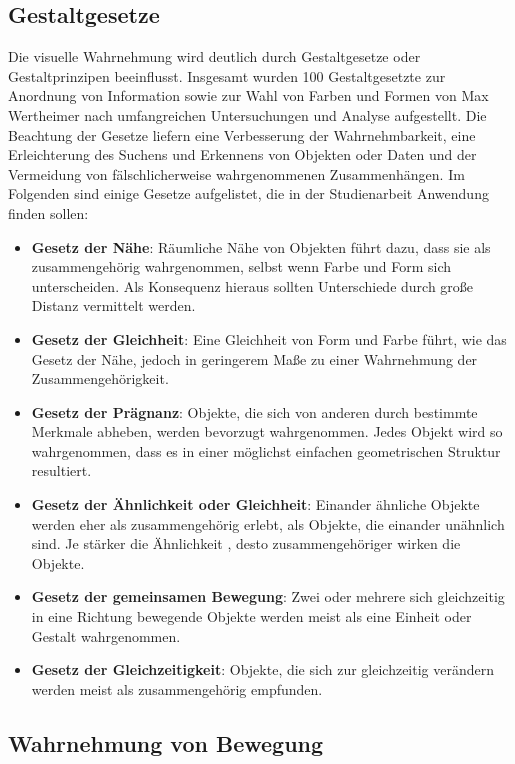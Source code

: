 \subsection{Gestaltgesetze}
Die visuelle Wahrnehmung wird deutlich durch Gestaltgesetze oder Gestaltprinzipen beeinflusst. Insgesamt wurden 100 Gestaltgesetzte zur Anordnung von Information sowie zur Wahl von Farben und Formen von Max Wertheimer nach umfangreichen Untersuchungen und Analyse aufgestellt. Die Beachtung der Gesetze liefern eine Verbesserung der Wahrnehmbarkeit, eine Erleichterung des Suchens und Erkennens von Objekten oder Daten und der Vermeidung von fälschlicherweise wahrgenommenen Zusammenhängen. \cite[S. 55 f.]{2010.Preim} Im Folgenden sind einige Gesetze aufgelistet, die in der Studienarbeit Anwendung finden sollen:

\begin{itemize}
\item \textbf{Gesetz der Nähe}: Räumliche Nähe von Objekten führt dazu, dass sie als zusammengehörig wahrgenommen, selbst wenn Farbe und Form sich unterscheiden. Als Konsequenz hieraus sollten Unterschiede durch große Distanz vermittelt werden. \cite[S. 56]{2010.Preim}
\item \textbf{Gesetz der Gleichheit}: Eine Gleichheit von Form und Farbe führt, wie das Gesetz der Nähe, jedoch in geringerem Maße zu einer Wahrnehmung der Zusammengehörigkeit. \cite[S. 56]{2010.Preim}
\item \textbf{Gesetz der Prägnanz}: Objekte, die sich von anderen durch bestimmte Merkmale abheben, werden bevorzugt wahrgenommen. Jedes Objekt wird so wahrgenommen, dass es in einer möglichst einfachen geometrischen Struktur resultiert. \cite{Gestaltgesetze}
\item \textbf{Gesetz der Ähnlichkeit oder Gleichheit}: Einander ähnliche Objekte werden eher als zusammengehörig erlebt, als Objekte, die einander unähnlich sind. Je stärker die Ähnlichkeit , desto zusammengehöriger wirken die Objekte. \cite{Gestaltgesetze}
\item \textbf{Gesetz der gemeinsamen Bewegung}: Zwei oder mehrere sich gleichzeitig in eine Richtung bewegende Objekte werden meist als eine Einheit oder Gestalt wahrgenommen. \cite{Gestaltgesetze}
\item \textbf{Gesetz der Gleichzeitigkeit}: Objekte, die sich zur gleichzeitig verändern werden meist als zusammengehörig empfunden. \cite{Gestaltgesetze}
\end{itemize}

\subsection{Wahrnehmung von Bewegung}

